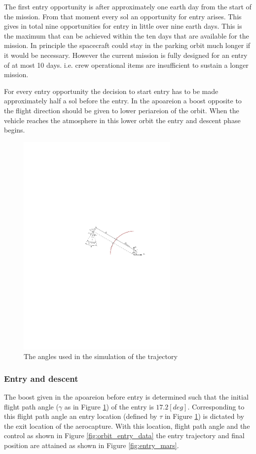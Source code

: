 The first entry opportunity is after approximately one earth day from the start of the mission. From that moment every sol an opportunity for entry arises. This gives in total nine opportunities for entry in little over nine earth days. This is the maximum that can be achieved within the ten days that are available for the mission. In principle the spacecraft could stay in the parking orbit much longer if it would be necessary. However the current mission is fully designed for an entry of at most 10 days. i.e. crew operational items are insufficient to sustain a longer mission.

For every entry opportunity the decision to start entry has to be made approximately half a sol before the entry. In the apoareion a boost opposite to the flight direction should be given to lower periareion of the orbit.  When the vehicle reaches the atmosphere in this lower orbit the entry and descent phase begins.

\begin{figure}[ht]
	\centering
	\includegraphics[width=0.7\textwidth]{Figure/Orbit/angles.pdf}
	\caption{The angles used in the simulation of the trajectory}
	\label{fig:angles}
\end{figure}

\subsubsection{Entry and descent}\label{sec:entry_descent}
The boost given in the apoareion before entry is determined such that the initial flight path angle ($\gamma$ as in Figure \ref{fig:angles}) of the entry is $17.2 \left[deg\right]$. Corresponding to this flight path angle an entry location (defined by $\tau$ in Figure \ref{fig:angles}) is dictated by the exit location of the aerocapture. With this location, flight path angle and the control as shown in Figure \ref{fig:orbit_entry_data} the entry trajectory and final position are attained as shown in Figure \ref{fig:entry_mars}.

